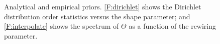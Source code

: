 \documentclass[12pt]{article}
\theoremstyle{plain}
\begin{document}
\begin{figure}[t]
    \centering
\vspace{-0.5em}
\caption{Analytical and empirical priors.
\ref{F:dirichlet} shows the Dirichlet distribution order statistics versus the shape parameter; and
\ref{F:interpolate} shows the spectrum of $\Theta$ as a function of the 
rewiring parameter.  }
\vspace{-1em}
\label{fig:priors}
\end{figure}
\end{document}
